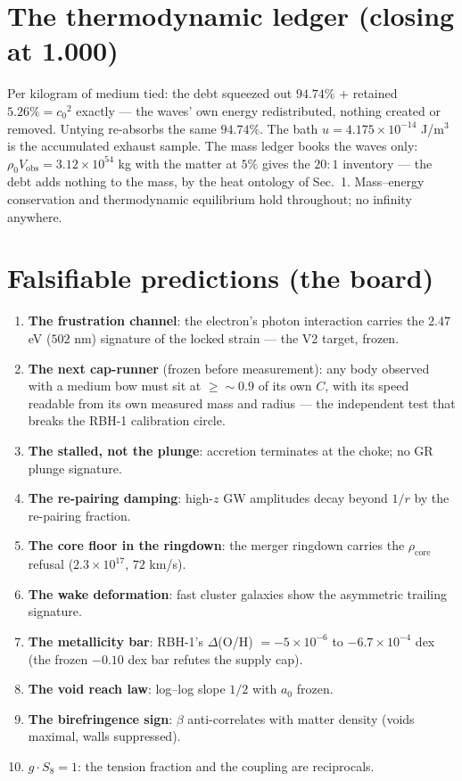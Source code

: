 \documentclass[11pt, a4paper]{article}
\newcommand{\cnot}{\ensuremath{c_0}}
\newcommand{\rhonot}{\ensuremath{\rho_0}}
\newcommand{\rhocore}{\ensuremath{\rho_{\mathrm{core}}}}
\begin{document}
\section{The thermodynamic ledger (closing at 1.000)}
Per kilogram of medium tied: the debt squeezed out $94.74\%$ + retained
$5.26\% = \cnot^2$ exactly --- the waves' own energy redistributed, nothing
created or removed. Untying re-absorbs the same $94.74\%$. The bath
$u = 4.175\times10^{-14}$ J/m$^3$ is the accumulated exhaust sample. The mass
ledger books the waves only: $\rhonot V_{\mathrm{obs}} = 3.12\times10^{54}$ kg
with the matter at $5\%$ gives the $20:1$ inventory --- the debt adds nothing to
the mass, by the heat ontology of Sec.~1. Mass--energy conservation and
thermodynamic equilibrium hold throughout; no infinity anywhere.

\section{Falsifiable predictions (the board)}
\label{sec:predictions}
\begin{enumerate}
\item \textbf{The frustration channel}: the electron's photon interaction carries
the $2.47$ eV ($502$ nm) signature of the locked strain --- the V2 target, frozen.
\item \textbf{The next cap-runner} (frozen before measurement): any body observed
with a medium bow must sit at $\ge \sim 0.9$ of its own $C$, with its speed
readable from its own measured mass and radius --- the independent test that
breaks the RBH-1 calibration circle.
\item \textbf{The stalled, not the plunge}: accretion terminates at the choke; no
GR plunge signature.
\item \textbf{The re-pairing damping}: high-$z$ GW amplitudes decay beyond $1/r$
by the re-pairing fraction.
\item \textbf{The core floor in the ringdown}: the merger ringdown carries the
$\rhocore$ refusal ($2.3\times10^{17}$, $72$ km/s).
\item \textbf{The wake deformation}: fast cluster galaxies show the asymmetric
trailing signature.
\item \textbf{The metallicity bar}: RBH-1's $\Delta$(O/H) $= -5\times10^{-6}$ to
$-6.7\times10^{-4}$ dex (the frozen $-0.10$ dex bar refutes the supply cap).
\item \textbf{The void reach law}: log--log slope $1/2$ with $a_0$ frozen.
\item \textbf{The birefringence sign}: $\beta$ anti-correlates with matter density
(voids maximal, walls suppressed).
\item \textbf{$g\cdot S_8 = 1$}: the tension fraction and the coupling are
reciprocals.
\end{enumerate}
\end{document}
